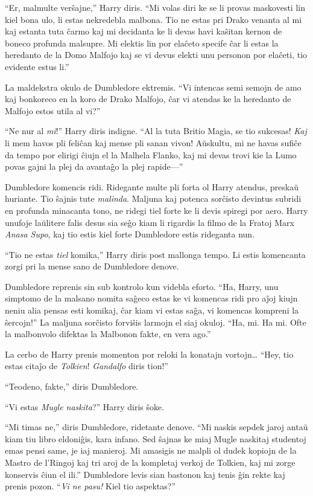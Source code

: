 ``Er, malmulte verŝajne,'' Harry diris. ``Mi volas diri ke se li
provas maskovesti lin kiel bona ulo, li estas nekredebla malbona. Tio
ne estas pri Drako venanta al mi kaj estanta tuta ĉarmo kaj mi
decidanta ke li devas havi kaŝitan kernon de boneco profunda
malsupre. Mi elektis lin por elaĉeto specife ĉar li estas la heredanto
de la Domo Malfojo kaj se vi devus elekti unu personon por elaĉeti,
tio evidente estus li.''

La maldekstra okulo de Dumbledore ektremis. ``Vi intencas semi semojn
de amo kaj bonkoreco en la koro de Drako Malfojo, ĉar vi atendas ke la
heredanto de Malfojo estos utila al vi?''

``Ne nur al \emph{mi}!'' Harry diris indigne. ``Al la tuta Britio
Magia, se tio sukcesas! \emph{Kaj} li mem havos pli feliĉan kaj mense
pli sanan vivon! Aŭskultu, mi ne havas sufiĉe da tempo por elirigi
ĉiujn el la Malhela Flanko, kaj mi devas trovi kie la Lumo povas
gajni la plej da avantaĝo la plej rapide—''

Dumbledore komencis ridi. Ridegante multe pli forta ol Harry atendus,
preskaŭ huriante. Tio ŝajnis tute \emph{malinda}. Maljuna kaj potenca
sorĉisto devintus subridi en profunda minacanta tono, ne ridegi tiel
forte ke li devis spiregi por aero. Harry unufoje laŭlitere falis
desus sia seĝo kiam li rigardis la filmo de la Fratoj Marx \emph{Anasa
  Supo}, kaj tio estis kiel forte Dumbledore estis rideganta nun.

``Tio ne estas \emph{tiel} komika,'' Harry diris post mallonga
tempo. Li estis komencanta zorgi pri la mense sano de Dumbledore
denove.


Dumbledore reprenis sin sub kontrolo kun videbla eforto. ``Ha, Harry,
unu simptomo de la malsano nomita saĝeco estas ke vi komencas ridi pro
aĵoj kiujn neniu alia pensas esti komikaj, ĉar kiam vi estas saĝa, vi
komencas kompreni la ŝercojn!'' La maljuna sorĉisto forviŝis larmojn
el siaj okuloj. ``Ha, mi. Ha mi. Ofte la malbonvolo difektas la
Malbonon fakte, en vera ago.''

La cerbo de Harry prenis momenton por reloki la konatajn vortojn\ldots
``Hey, tio estas citaĵo de \emph{Tolkien}! \emph{Gandalfo} diris
tion!''

``Teodeno, fakte,'' diris Dumbledore.

``Vi estas \emph{Mugle naskita}?'' Harry diris ŝoke.

``Mi timas ne,'' diris Dumbledore, ridetante denove. ``Mi naskis
sepdek jaroj antaŭ kiam tiu libro eldoniĝis, kara infano. Sed ŝajnas
ke miaj Mugle naskitaj studentoj emas pensi same, je iaj manieroj. Mi
amasigis ne malpli ol dudek kopiojn de la Mastro de l'Ringoj kaj tri
aroj de la kompletaj verkoj de Tolkien, kaj mi zorge konservis ĉiun el
ili.'' Dumbledore levis sian bastonon kaj tenis ĝin rekte kaj prenis
pozon. ``\emph{Vi ne pasu!} Kiel tio aspektas?''


